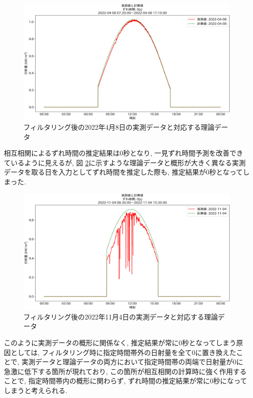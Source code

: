 \documentclass[a4j,12pt,]{jarticle}
\begin{document}
\begin{figure}[H]
  \begin{center}
    \includegraphics[width=160mm]{2022-04-08_partial_corr.png}
    \caption{フィルタリング後の2022年4月8日の実測データと対応する理論データ}
    \label{p6}
  \end{center}
\end{figure}

相互相関によるずれ時間の推定結果は0秒となり, 一見ずれ時間予測を改善できているように見えるが, 図 \ref{p7}に示すような理論データと概形が大きく異なる実測データを取る日を入力としてずれ時間を推定した際も, 推定結果が0秒となってしまった.

\begin{figure}[H]
  \begin{center}
    \includegraphics[width=160mm]{2022-11-04_partial_corr.png}
    \caption{フィルタリング後の2022年11月4日の実測データと対応する理論データ}
    \label{p7}
  \end{center}
\end{figure}

このように実測データの概形に関係なく, 推定結果が常に0秒となってしまう原因としては, フィルタリング時に指定時間帯外の日射量を全て0に置き換えたことで, 実測データと理論データの両方において指定時間帯の両端で日射量が0に急激に低下する箇所が現れており, この箇所が相互相関の計算時に強く作用することで, 指定時間帯内の概形に関わらず, ずれ時間の推定結果が常に0秒になってしまうと考えられる.
\end{document}

